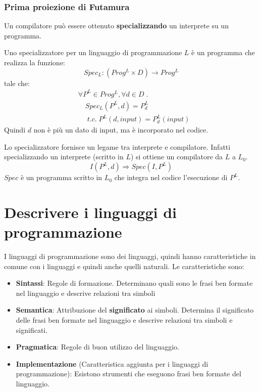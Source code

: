 \documentclass[a4paper]{article}
\begin{document}
\subsubsection{Prima proiezione di Futamura}
Un compilatore può essere ottenuto \textbf{specializzando} un interprete
su un programma.

\begin{definition}[Specializzatore]
  Uno specializzatore per un linguaggio di programmazione \( L \) è un
  programma che realizza la funzione:
  \[
    Spec_L: (Prog^L \times D) \to Prog^L
  \] 
  tale che:
  \[
    \begin{aligned}
      & \forall P^L \in Prog^L, \forall d \in D \;.\; \\
      &\quad Spec_L(P^L, d) = P^L_d\\
      &\quad \; t.c. \; P^L(d, input) = P^L_d(input)
    \end{aligned}
  \] 
  Quindi \( d \) non è più un dato di input, ma è incorporato nel codice.

  \vspace{1em}
  \noindent
  Lo specializzatore fornisce un legame tra interprete e compilatore. Infatti
  specializzando un interprete (scritto in \( L \)) si ottiene un
  compilatore da \( L \) a \( L_0 \).
  \[
    I(P^L, d) \Rightarrow Spec(I, P^L)
  \] 
  \( Spec \) è un programma scritto in \( L_0 \) che integra nel codice
  l'esecuzione di \( P^L \).
\end{definition}

\section{Descrivere i linguaggi di programmazione}
I linguaggi di programmazione sono dei linguaggi, quindi hanno caratteristiche
in comune con i linguaggi e quindi anche quelli naturali. Le caratteristiche sono:
\begin{itemize}
  \item \textbf{Sintassi}: Regole di formazione. Determinano quali sono
    le frasi ben formate nel linguaggio e descrive relazioni tra simboli

  \item \textbf{Semantica}: Attribuzione del \textbf{significato} ai simboli.
    Determina il significato delle frasi ben formate nel linguaggio e descrive
    relazioni tra simboli e significati.

  \item \textbf{Pragmatica}: Regole di buon utilizzo del linguaggio.

  \item \textbf{Implementazione} (Caratteristica aggiunta per i linguaggi di programmazione):
    Esistono strumenti che eseguono frasi ben formate del linguaggio.
\end{itemize}
\end{document}
